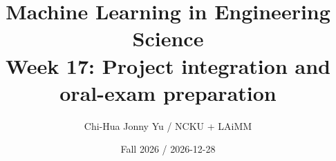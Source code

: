 \documentclass[11pt,oneside]{book}
\begin{document}
\title{Machine Learning in Engineering Science\\\large Week 17: Project integration and oral-exam preparation}\author{Chi-Hua Jonny Yu / NCKU + LAiMM}\date{Fall 2026 / 2026-12-28}\maketitle

\end{document}
